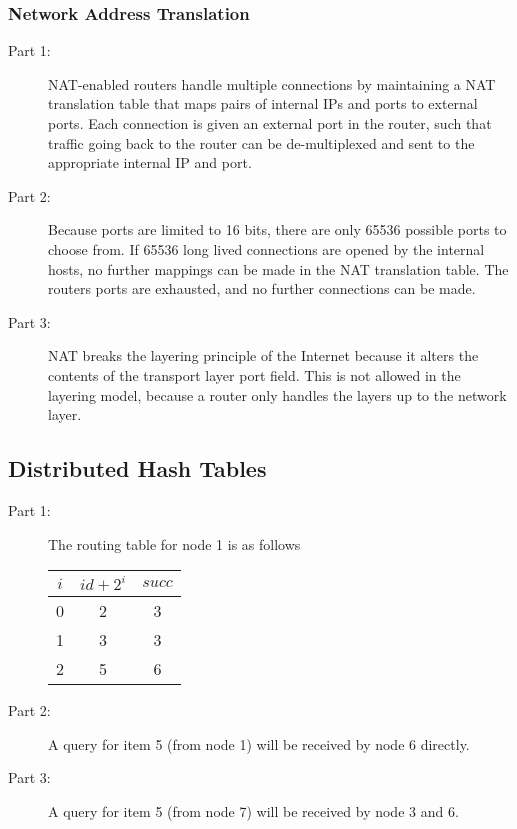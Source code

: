 \subsubsection{Network Address Translation}
\begin{description}
    \item[Part 1:] NAT-enabled routers handle multiple connections by maintaining a NAT translation
        table that maps pairs of internal IPs and ports to external ports. Each connection is given
        an external port in the router, such that traffic going back to the router can be de-multiplexed
        and sent to the appropriate internal IP and port.
    \item[Part 2:] Because ports are limited to 16 bits, there are only 65536 possible ports to choose from.
        If 65536 long lived connections are opened by the internal hosts, no further mappings can be made in
        the NAT translation table. The routers ports are exhausted, and no further connections can be made.
    \item[Part 3:] NAT breaks the layering principle of the Internet because it alters the contents of the 
        transport layer port field. This is not allowed in the layering model, because a router only handles
        the layers up to the network layer.
\end{description}

\subsection{Distributed Hash Tables}
\begin{description}
    \item[Part 1:] The routing table for node 1 is as follows\\
        \begin{tabular}{|c|c|c|}
            \hline
            $i$ & $id + 2^{i}$ & $succ$ \\ \hline
            0 & 2 & 3 \\ \hline
            1 & 3 & 3 \\ \hline
            2 & 5 & 6 \\
            \hline
        \end{tabular}

    \item[Part 2:] A query for item 5 (from node 1) will be received by node 6 directly.
    \item[Part 3:] A query for item 5 (from node 7) will be received by node 3 and 6.
\end{description}

